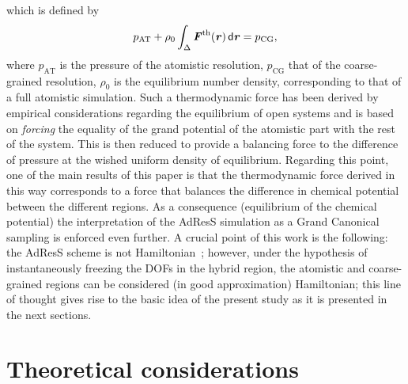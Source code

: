 \documentclass[aps,a4paper,reprint,onecolumn]{revtex4}
\newcommand{\vect}[1]{\textbf{\textit{#1}}}
\newcommand{\dd}[1]{\textsf{#1}}
\newcommand{\AT}{{\textrm{{AT}}}}
\newcommand{\CG}{{\textrm{CG}}}
\begin{document}
which is defined by
\begin{equation}
  p_{\AT}+
  \rho_0
  \int_{\Delta} {\vect F}^\text{th}(\vect r)\,\dd d\vect r
  =p_{\CG},
  \label{thf}
\end{equation}
where $p_{\AT}$ is the pressure of the atomistic resolution, $p_{\CG}$ that of the coarse-grained resolution, $\rho_{0}$ is the equilibrium number density, corresponding to that of a full atomistic simulation.
Such a thermodynamic force has been derived by empirical considerations regarding the equilibrium of open systems and is based on {\it forcing} the equality of the grand potential of the atomistic part with the rest of the system.
This is then reduced to provide a balancing force to the difference of pressure at the wished uniform density of equilibrium. Regarding this point, one of the main results of this paper is that the thermodynamic force derived in this way corresponds to a force that balances the difference in chemical potential between the different regions. As a consequence (equilibrium of the chemical potential) the interpretation of the AdResS simulation as a Grand Canonical sampling is enforced even further.
 A crucial point of this work is the following: the 
AdResS scheme is not Hamiltonian~\cite{presolo,prlcomm}; however, under the hypothesis of instantaneously
freezing the DOFs in the hybrid region, the atomistic and
coarse-grained regions can be considered (in good approximation) Hamiltonian; this line of thought gives rise to the basic
idea of the present study as it is presented in the next sections.

\section{Theoretical considerations}
\end{document}
